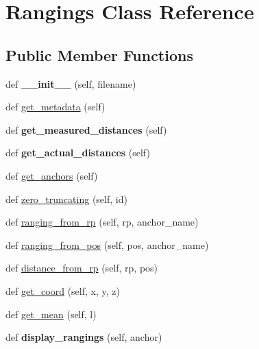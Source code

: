 \hypertarget{classread_rangings_1_1_rangings}{}\section{Rangings Class Reference}
\label{classread_rangings_1_1_rangings}
\subsection*{Public Member Functions}
\begin{DoxyCompactItemize}
\item 
\mbox{\label{classread_rangings_1_1_rangings_ad5de178e9da2711c5bc270200dc25568}} 
def {\bfseries \+\_\+\+\_\+init\+\_\+\+\_\+} (self, filename)
\item 
def \mbox{\hyperlink{classread_rangings_1_1_rangings_a4bf6b24f95dbd9e6388503f474e0be05}{get\+\_\+metadata}} (self)
\item 
\mbox{\label{classread_rangings_1_1_rangings_a2e0bff0a825b8e6ac6f5e387c1c63306}} 
def {\bfseries get\+\_\+measured\+\_\+distances} (self)
\item 
\mbox{\label{classread_rangings_1_1_rangings_a50bb794ef6124d0dc9cdc85ce94de73c}} 
def {\bfseries get\+\_\+actual\+\_\+distances} (self)
\item 
def \mbox{\hyperlink{classread_rangings_1_1_rangings_a9cab236ac56c4f2245c8f87035f736ef}{get\+\_\+anchors}} (self)
\item 
def \mbox{\hyperlink{classread_rangings_1_1_rangings_a31dd1b70ec4bf449637fa2500a516f39}{zero\+\_\+truncating}} (self, id)
\item 
def \mbox{\hyperlink{classread_rangings_1_1_rangings_a3720c2eca68a86eb32876fad24d37b65}{ranging\+\_\+from\+\_\+rp}} (self, rp, anchor\+\_\+name)
\item 
def \mbox{\hyperlink{classread_rangings_1_1_rangings_a993884eadd2abd392aa1b4d0aca03d57}{ranging\+\_\+from\+\_\+pos}} (self, pos, anchor\+\_\+name)
\item 
def \mbox{\hyperlink{classread_rangings_1_1_rangings_ae9f85ff6eeb7be193c52d772e6aeacfb}{distance\+\_\+from\+\_\+rp}} (self, rp, pos)
\item 
def \mbox{\hyperlink{classread_rangings_1_1_rangings_aec61a49900a125b0b6f614e94fba7003}{get\+\_\+coord}} (self, x, y, z)
\item 
def \mbox{\hyperlink{classread_rangings_1_1_rangings_aed4577c8cb31856946ba215ba6b235cc}{get\+\_\+mean}} (self, l)
\item 
\mbox{\label{classread_rangings_1_1_rangings_a870abf917024d9f1b7c4de52ae343585}} 
def {\bfseries display\+\_\+rangings} (self, anchor)
\end{DoxyCompactItemize}

